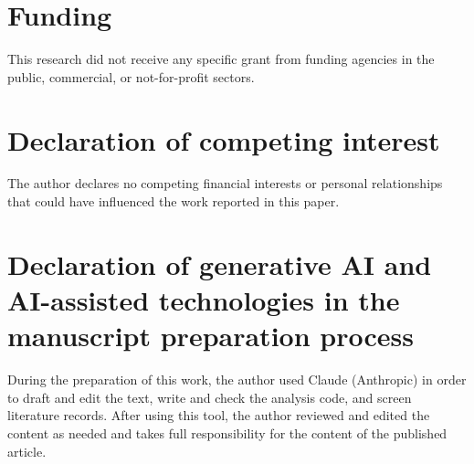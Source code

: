 \documentclass[final,5p,times,twocolumn]{elsarticle}
\begin{document}
\section*{Funding}
This research did not receive any specific grant from funding agencies in the public, commercial,
or not-for-profit sectors.

\section*{Declaration of competing interest}
The author declares no competing financial interests or personal relationships that could have
influenced the work reported in this paper.

\section*{Declaration of generative AI and AI-assisted technologies in the manuscript preparation
process}
During the preparation of this work, the author used Claude (Anthropic) in order to draft and edit
the text, write and check the analysis code, and screen literature records. After using this
tool, the author reviewed and edited the content as needed and takes full responsibility for the
content of the published article.



\end{document}
